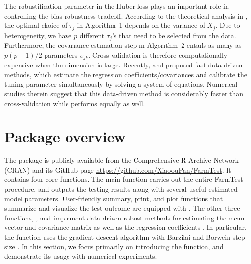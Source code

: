 The robustification parameter in the Huber loss plays an important role in controlling the bias-robustness tradeoff. According to the theoretical analysis in \cite{ZBFL2017}, the optimal choice of $\tau_j$ in Algorithm~1 depends on the variance of $X_j$.  Due to heterogeneity, we have $p$ different $\tau_j$'s that need to be selected from the data. Furthermore, the covariance estimation step in Algorithm~2 entails as many as $p\left(p-1\right)/2$ parameters $\upsilon_{jk}$. Cross-validation is therefore computationally expensive when the dimension is large.
Recently, \cite{KMRSZ2019} and \cite{WZZZ2020} proposed fast data-driven methods, which estimate the regression coefficients/covariances and calibrate the tuning parameter simultaneously by solving a system of equations. Numerical studies therein suggest that this data-driven method is considerably faster than cross-validation while performs equally as well. 





\section[Package overview]{Package overview}
\label{sec:overview}

The  package is publicly available from the Comprehensive R Archive Network (CRAN) %
and its GitHub page \url{https://github.com/XiaoouPan/FarmTest}.
It contains four core functions. The main function  carries out the entire FarmTest procedure, and outputs the testing results along with several useful estimated model parameters. User-friendly summary, print, and plot functions that summarize and visualize the test outcome are equipped with .
The other three functions, ,  and  implement data-driven robust methods for estimating the mean vector and covariance matrix \citep{KMRSZ2019} as well as the regression coefficients \citep{WZZZ2020}.
In particular, the  function uses the gradient descent algorithm with Barzilai and Borwein step size \citep{BB1988}.
In this section, we focus primarily on introducing the  function, and demonstrate its usage with numerical experiments.





